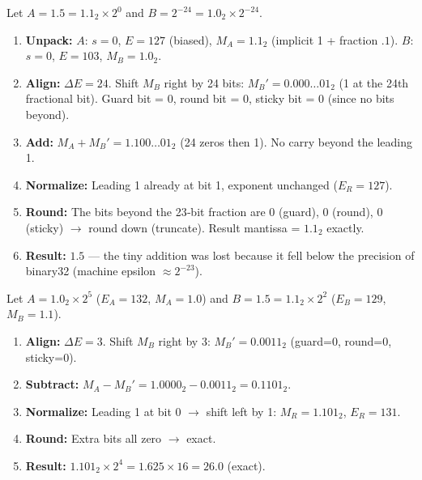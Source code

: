 \documentclass[11pt]{article}
\begin{document}
\begin{exemplebox}
Let $A = 1.5 = 1.1_2 \times 2^0$ and $B = 2^{-24} = 1.0_2 \times 2^{-24}$.
\begin{enumerate}
\item \textbf{Unpack:} $A$: $s=0$, $E=127$ (biased), $M_A = 1.1_2$ (implicit 1 + fraction $.1$). $B$: $s=0$, $E=103$, $M_B = 1.0_2$.
\item \textbf{Align:} $\Delta E = 24$. Shift $M_B$ right by 24 bits: $M_B' = 0.000\ldots01_2$ (1 at the 24th fractional bit). Guard bit = 0, round bit = 0, sticky bit = 0 (since no bits beyond).
\item \textbf{Add:} $M_A + M_B' = 1.100\ldots01_2$ (24 zeros then 1). No carry beyond the leading 1.
\item \textbf{Normalize:} Leading 1 already at bit 1, exponent unchanged ($E_R=127$).
\item \textbf{Round:} The bits beyond the 23‑bit fraction are 0 (guard), 0 (round), 0 (sticky) $\to$ round down (truncate). Result mantissa = $1.1_2$ exactly.
\item \textbf{Result:} $1.5$ — the tiny addition was lost because it fell below the precision of binary32 (machine epsilon $\approx 2^{-23}$).
\end{enumerate}
\end{exemplebox}

\begin{exemplebox}
Let $A = 1.0_2 \times 2^5$ ($E_A=132$, $M_A=1.0$) and $B = 1.5 = 1.1_2 \times 2^2$ ($E_B=129$, $M_B=1.1$).
\begin{enumerate}
\item \textbf{Align:} $\Delta E = 3$. Shift $M_B$ right by 3: $M_B' = 0.0011_2$ (guard=0, round=0, sticky=0).
\item \textbf{Subtract:} $M_A - M_B' = 1.0000_2 - 0.0011_2 = 0.1101_2$.
\item \textbf{Normalize:} Leading 1 at bit 0 $\to$ shift left by 1: $M_R = 1.101_2$, $E_R = 131$.
\item \textbf{Round:} Extra bits all zero $\to$ exact.
\item \textbf{Result:} $1.101_2 \times 2^4 = 1.625 \times 16 = 26.0$ (exact).
\end{enumerate}
\end{exemplebox}
\end{document}
